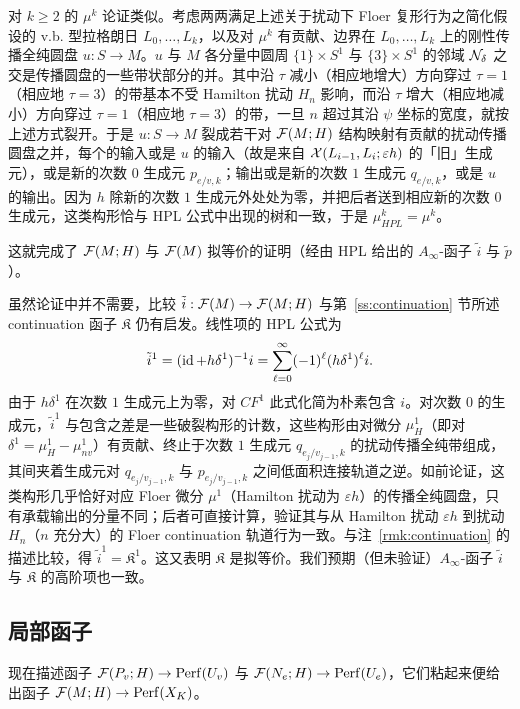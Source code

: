 对 $k\geq 2$ 的 $\mu^k$ 论证类似。考虑两两满足上述关于扰动下 Floer 复形行为之简化假设的 v.b. 型拉格朗日 $L_0,\dots,L_k$，以及对 $\mu^k$ 有贡献、边界在 $L_0,\dots,L_k$ 上的刚性传播全纯圆盘 $u:S\to M$。$u$ 与 $M$ 各分量中圆周 $\{1\}\times S^1$ 与 $\{3\}\times S^1$ 的邻域 $\mathcal{N}_\delta$ 之交是传播圆盘的一些带状部分的并。其中沿 $\tau$ 减小（相应地增大）方向穿过 $\tau=1$（相应地 $\tau=3$）的带基本不受 Hamilton 扰动 $H_n$ 影响，而沿 $\tau$ 增大（相应地减小）方向穿过 $\tau=1$（相应地 $\tau=3$）的带，一旦 $n$ 超过其沿 $\psi$ 坐标的宽度，就按上述方式裂开。于是 $u:S\to M$ 裂成若干对 $\mathcal{F}(M;H)$ 结构映射有贡献的扰动传播圆盘之并，每个的输入或是 $u$ 的输入（故是来自 $\mathcal{X}(L_{i-1},L_i;\varepsilon h)$ 的「旧」生成元），或是新的次数 $0$ 生成元 $p_{e/v,k}$；输出或是新的次数 $1$ 生成元 $q_{e/v,k}$，或是 $u$ 的输出。因为 $h$ 除新的次数 $1$ 生成元外处处为零，并把后者送到相应新的次数 $0$ 生成元，这类构形恰与 HPL 公式中出现的树和一致，于是 $\mu^k_{HPL}=\mu^k$。

这就完成了 $\mathcal{F}(M;H)$ 与 $\mathcal{F}(M)$ 拟等价的证明（经由 HPL 给出的 $A_\infty$-函子 $\tilde{i}$ 与 $\tilde{p}$）。

虽然论证中并不需要，比较 $\tilde{i}:\mathcal{F}(M)\to \mathcal{F}(M;H)$ 与第~\ref{ss:continuation} 节所述 continuation 函子 $\mathfrak{K}$ 仍有启发。线性项的 HPL 公式为
\[
\tilde{i}^1=(\operatorname{id}+h\delta^1)^{-1}i=\sum_{\ell=0}^\infty(-1)^\ell (h\delta^1)^\ell i.
\]
由于 $h\delta^1$ 在次数 $1$ 生成元上为零，对 $CF^1$ 此式化简为朴素包含 $i$。对次数 $0$ 的生成元，$\tilde{i}^1$ 与包含之差是一些破裂构形的计数，这些构形由对微分 $\mu^1_H$（即对 $\delta^1=\mu^1_H-\mu^1_{nv}$）有贡献、终止于次数 $1$ 生成元 $q_{e_j/v_{j-1},k}$ 的扰动传播全纯带组成，其间夹着生成元对 $q_{e_j/v_{j-1},k}$ 与 $p_{e_j/v_{j-1},k}$ 之间低面积连接轨道之逆。如前论证，这类构形几乎恰好对应 Floer 微分 $\mu^1$（Hamilton 扰动为 $\varepsilon h$）的传播全纯圆盘，只有承载输出的分量不同；后者可直接计算，验证其与从 Hamilton 扰动 $\varepsilon h$ 到扰动 $H_n$（$n$ 充分大）的 Floer continuation 轨道行为一致。与注~\ref{rmk:continuation} 的描述比较，得 $\tilde{i}^1=\mathfrak{K}^1$。这又表明 $\mathfrak{K}$ 是拟等价。我们预期（但未验证）$A_\infty$-函子 $\tilde{i}$ 与 $\mathfrak{K}$ 的高阶项也一致。

\subsection{局部函子}\label{ss:localfunctors}

现在描述函子 $\mathcal{F}(P_v;H)\to \operatorname{Perf}(U_v)$ 与 $\mathcal{F}(N_e;H)\to \operatorname{Perf}(U_e)$，它们粘起来便给出函子 $\mathcal{F}(M;H)\to\operatorname{Perf}(X_K)$。

